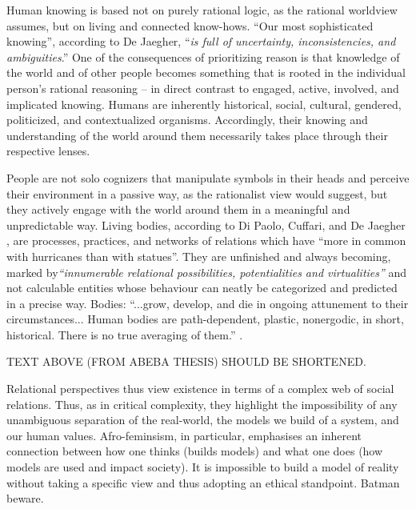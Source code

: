 Human knowing is based not on purely rational logic, as the rational worldview assumes, but on living and connected know-hows. ``Our most sophisticated knowing'', according to De Jaegher, ``\textit{is full of uncertainty, inconsistencies, and ambiguities}.'' One of the consequences of prioritizing reason is that knowledge of the world and of other people becomes something that is rooted in the individual person’s rational reasoning – in direct contrast to engaged, active, involved, and implicated knowing. Humans are inherently historical, social, cultural, gendered, politicized, and contextualized organisms. Accordingly, their knowing and understanding of the world around them necessarily takes place through their respective lenses.

People are not solo cognizers that manipulate symbols in their heads and perceive their environment in a passive way, as the rationalist view would suggest, but they actively engage with the world around them in a meaningful and unpredictable way. Living bodies, according to Di Paolo, Cuffari, and De Jaegher \cite{di2018linguistic}, are processes, practices, and networks of relations which have ``more in common with hurricanes than with statues''. They are unfinished and always becoming, marked by\textit{``innumerable relational possibilities, potentialities and virtualities''} and not calculable entities whose behaviour can neatly be categorized and predicted in a precise way. Bodies: ``...grow, develop, and die in ongoing attunement to their circumstances... Human bodies are path-dependent, plastic, nonergodic, in short, historical. There is no true averaging of them.'' \citep[p.97]{di2018linguistic}. 

TEXT ABOVE (FROM ABEBA THESIS) SHOULD BE SHORTENED.

Relational perspectives thus view existence in terms of a complex web of social relations. Thus, as in critical complexity, they highlight the impossibility of any unambiguous separation of the real-world, the models we build of a system, and our human values. Afro-feminsism, in particular, emphasises an inherent connection between how one thinks (builds models) and what one does (how models are used and impact society). It is impossible to build a model of reality without taking a specific view and thus adopting an ethical standpoint. Batman beware.
